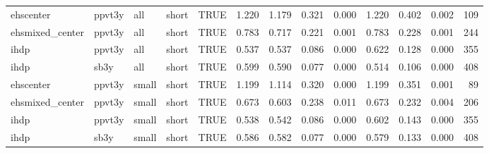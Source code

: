 \begin{table}[ht]
\begin{tabular}{lllllrrrrrrrr}
  ehscenter & ppvt3y & all & short & TRUE & 1.220 & 1.179 & 0.321 & 0.000 & 1.220 & 0.402 & 0.002 & 109 \\ 
  ehsmixed\_center & ppvt3y & all & short & TRUE & 0.783 & 0.717 & 0.221 & 0.001 & 0.783 & 0.228 & 0.001 & 244 \\ 
  ihdp & ppvt3y & all & short & TRUE & 0.537 & 0.537 & 0.086 & 0.000 & 0.622 & 0.128 & 0.000 & 355 \\ 
  ihdp & sb3y & all & short & TRUE & 0.599 & 0.590 & 0.077 & 0.000 & 0.514 & 0.106 & 0.000 & 408 \\ 
  ehscenter & ppvt3y & small & short & TRUE & 1.199 & 1.114 & 0.320 & 0.000 & 1.199 & 0.351 & 0.001 & 89 \\ 
  ehsmixed\_center & ppvt3y & small & short & TRUE & 0.673 & 0.603 & 0.238 & 0.011 & 0.673 & 0.232 & 0.004 & 206 \\ 
  ihdp & ppvt3y & small & short & TRUE & 0.538 & 0.542 & 0.086 & 0.000 & 0.602 & 0.143 & 0.000 & 355 \\ 
  ihdp & sb3y & small & short & TRUE & 0.586 & 0.582 & 0.077 & 0.000 & 0.579 & 0.133 & 0.000 & 408 \\ 
   \hline
\end{tabular}
\end{table}
